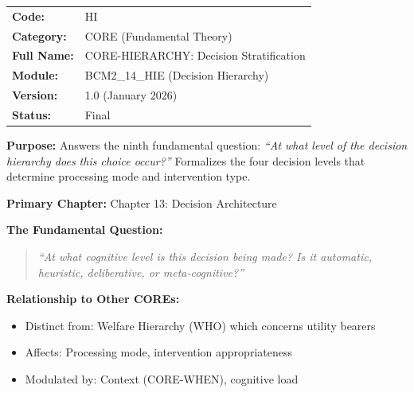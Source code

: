 %
%
%

\begin{tcolorbox}[colback=gray!5!white, colframe=gray!75!black,
    title=Appendix Header: HI CORE-HIERARCHY]

\begin{tabular}{@{}ll@{}}
\textbf{Code:} & HI \\
\textbf{Category:} & CORE (Fundamental Theory) \\
\textbf{Full Name:} & CORE-HIERARCHY: Decision Stratification \\
\textbf{Module:} & BCM2\_14\_HIE (Decision Hierarchy) \\
\textbf{Version:} & 1.0 (January 2026) \\
\textbf{Status:} & Final \\
\end{tabular}

\vspace{0.5em}
\textbf{Purpose:} Answers the ninth fundamental question:
\textit{``At what level of the decision hierarchy does this choice occur?''}
Formalizes the four decision levels that determine processing mode and intervention type.

\end{tcolorbox}

\begin{tcolorbox}[colback=purple!5!white, colframe=purple!75!black,
    title=Chapter Linkage]

\textbf{Primary Chapter:} Chapter 13: Decision Architecture

\textbf{The Fundamental Question:}
\begin{quote}
\textit{``At what cognitive level is this decision being made? Is it automatic,
heuristic, deliberative, or meta-cognitive?''}
\end{quote}

\textbf{Relationship to Other COREs:}
\begin{itemize}[nosep]
\item Distinct from: Welfare Hierarchy (WHO) which concerns utility bearers
\item Affects: Processing mode, intervention appropriateness
\item Modulated by: Context (CORE-WHEN), cognitive load
\end{itemize}

\end{tcolorbox}

